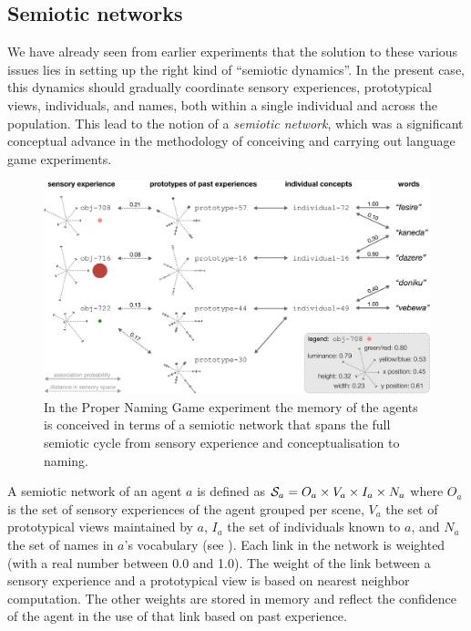 \subsection{Semiotic networks}
We have already seen from earlier experiments that the solution to these various issues lies in setting up
the right kind of ``semiotic dynamics''. In the present case, this dynamics should gradually coordinate
sensory experiences, prototypical views, individuals, 
and names, both within a single individual and across the
population. This lead to the notion of a {\itshape semiotic network}, which was a significant conceptual advance 
in the methodology of conceiving and carrying out language game experiments.

\begin{figure}[b]
  \centerline{\includegraphics[width=.95\textwidth]{chap10/figs/prototypes-identifiers-words.pdf}}
\caption{\label{fig:prototypes-identifiers-words}In the Proper Naming Game experiment the memory of the agents is conceived in terms of a semiotic network that 
spans the full semiotic cycle from sensory experience and conceptualisation to naming.}
\end{figure}

A semiotic network of an agent $a$ is defined as 
${\cal S}_a = O_a \times V_a \times I_a \times N_a$ where $O_a$ is the set of
sensory experiences of the agent grouped per scene, $V_a$ the set of
prototypical views maintained by $a$, $I_a$ the set of individuals
 known to $a$, and $N_a$ the set of names in $a$'s vocabulary
(see 
). Each link in the network is weighted (with a real number between 0.0 and 1.0). The
weight of the link between a sensory experience and a prototypical
view is based on nearest neighbor computation. The other weights are
stored in memory and reflect the confidence of the agent in the use of
that link based on past experience. 

